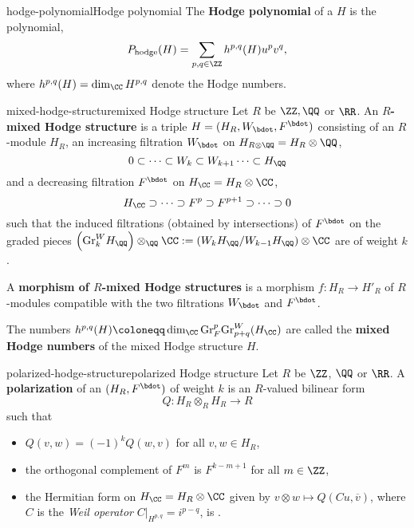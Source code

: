 \begin{topic}{hodge-polynomial}{Hodge polynomial}
    The \textbf{Hodge polynomial} of a  $H$ is the polynomial,
    \[ P_\textup{hodge}(H) = \sum_{p, q \in \ZZ} h^{p, q}(H) u^p v^q , \]
    where $h^{p, q}(H) = \dim_\CC H^{p, q}$ denote the Hodge numbers.
\end{topic}

\begin{topic}{mixed-hodge-structure}{mixed Hodge structure}
    Let $R$ be $\ZZ, \QQ$ or $\RR$. An \textbf{$R$-mixed Hodge structure} is a triple $H = (H_R, W_\bdot, F^\bdot)$ consisting of an $R$-module $H_R$, an increasing filtration $W_\bdot$ on $H_{R \otimes \QQ} = H_R \otimes \QQ$,
    \[ 0 \subset \cdots \subset W_k \subset W_{k + 1} \cdots \subset H_\QQ \]
    and a decreasing filtration $F^\bdot$ on $H_\CC = H_R \otimes \CC$,
    \[ H_\CC \supset \cdots \supset F^p \supset F^{p + 1} \supset \cdots \supset 0 \]
    such that the induced filtrations (obtained by intersections) of $F^\bdot$ on the graded pieces $\left(\textup{Gr}^W_k H_\QQ\right) \otimes_\QQ \CC := \left(W_k H_\QQ / W_{k - 1} H_\QQ\right) \otimes \CC$ are  of weight $k$.
    
    A \textbf{morphism of $R$-mixed Hodge structures} is a morphism $f : H_R \to H'_R$ of $R$-modules compatible with the two filtrations $W_\bdot$ and $F^\bdot$.
    
    The numbers $h^{p, q}(H) \coloneqq \dim_\CC \textup{Gr}_F^p \textup{Gr}^W_{p + q}(H_\CC)$ are called the \textbf{mixed Hodge numbers} of the mixed Hodge structure $H$.
\end{topic}

\begin{topic}{polarized-hodge-structure}{polarized Hodge structure}
    Let $R$ be $\ZZ$, $\QQ$ or $\RR$. A \textbf{polarization} of an  $(H_R, F^\bdot)$ of weight $k$ is an $R$-valued bilinear form
    \[ Q : H_R \otimes_R H_R \to R \]
    such that
    \begin{itemize}
        \item $Q(v, w) = (-1)^k Q(w, v)$ for all $v, w \in H_R$,
        \item the orthogonal complement of $F^m$ is $F^{k - m + 1}$ for all $m \in \ZZ$,
        \item the Hermitian form on $H_\CC = H_R \otimes \CC$ given by $v \otimes w \mapsto Q(C u, \overline{v})$, where $C$ is the \textit{Weil operator} $C|_{H^{p, q}} = i^{p - q}$, is .
    \end{itemize}
\end{topic}
